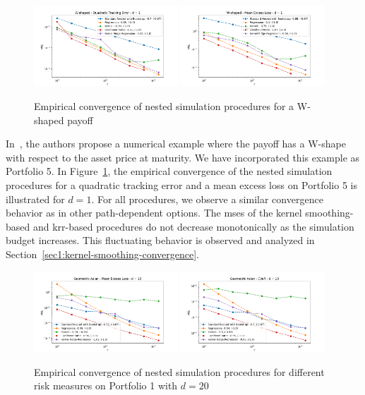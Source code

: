 \begin{figure}[ht!] 
    \centering
    \includegraphics[width=0.48\textwidth]{./project1/figures/figure7a.png}
    \includegraphics[width=0.48\textwidth]{./project1/figures/figure7b.png}
    \caption{Empirical convergence of nested simulation procedures for a W-shaped payoff}
\label{fig1:5503} 
\end{figure}

In~\cite{broadie2015risk}, the authors propose a numerical example where the payoff has a W-shape with respect to the asset price at maturity.
We have incorporated this example as Portfolio 5.
In Figure~\ref{fig1:5503}, the empirical convergence of the nested simulation procedures for a quadratic tracking error and a mean excess loss on Portfolio 5 is illustrated for $d = 1$.
For all procedures, we observe a similar convergence behavior as in other path-dependent options.
The \gls{mse}s of the kernel smoothing-based and \gls{krr}-based procedures do not decrease monotonically as the simulation budget increases.
This fluctuating behavior is observed and analyzed in Section~\ref{sec1:kernel-smoothing-convergence}.

\begin{figure}[ht!] 
    \centering
    \includegraphics[width=0.48\textwidth]{./project1/figures/figure8a.png}
    \includegraphics[width=0.48\textwidth]{./project1/figures/figure8b.png}
    \caption{Empirical convergence of nested simulation procedures for different risk measures on Portfolio 1 with $d=20$}
\label{fig1:110x}
\end{figure}

